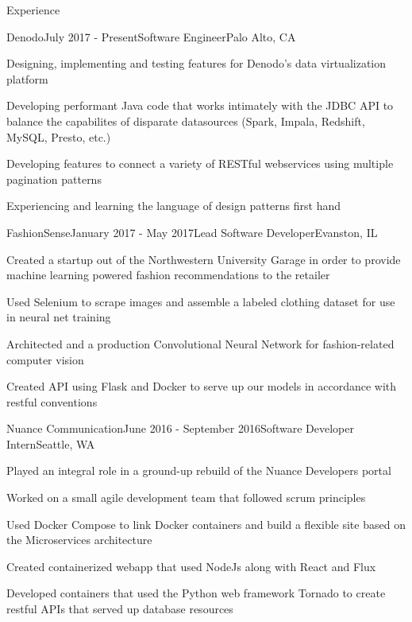 \documentclass{resume} %
\begin{document}
\begin{rSection}{Experience}

\begin{rSubsection}{Denodo}{July 2017 - Present}{Software Engineer}{Palo Alto, CA}
\item Designing, implementing and testing features for Denodo's data virtualization platform
\item Developing performant Java code that works intimately with the JDBC API to balance the capabilites of disparate datasources (Spark, Impala, Redshift, MySQL, Presto, etc.)
\item Developing features to connect a variety of RESTful webservices using multiple pagination patterns
\item Experiencing and learning the language of design patterns first hand
\end{rSubsection}

\begin{rSubsection}{FashionSense}{January 2017 - May 2017}{Lead Software Developer}{Evanston, IL}
\item Created a startup out of the Northwestern University Garage in order to provide machine learning powered fashion recommendations to the retailer
\item Used Selenium to scrape images and assemble a labeled clothing dataset for use in neural net training
\item Architected and a production Convolutional Neural Network for fashion-related computer vision
\item Created API using Flask and Docker to serve up our models in accordance with restful conventions
\end{rSubsection}


\begin{rSubsection}{Nuance Communication}{June 2016 - September 2016}{Software Developer Intern}{Seattle, WA}
\item Played an integral role in a ground-up rebuild of the Nuance Developers portal
\item Worked on a small agile development team that followed scrum principles
\item Used Docker Compose to link Docker containers and build a flexible site based on the
Microservices architecture
\item Created containerized webapp that used NodeJs along with React and Flux
\item Developed containers that used the Python web framework Tornado to create restful APIs that served up database resources
\end{rSubsection}


\end{rSection}
\end{document}
